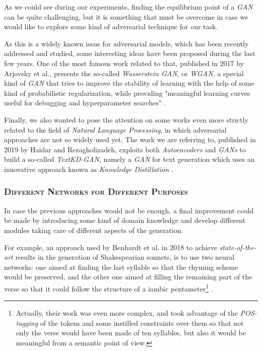 As we could see during our experiments, finding the equilibrium point of a \textit{GAN} can be quite challenging, but it is something that must be overcome in case we would like to explore some kind of adversarial technique for our task.

As this is a widely known issue for adversarial models, which has been recently addressed and studied, some interesting ideas have been proposed during the last few years.
One of the most famous work related to that, published in 2017 by Arjovsky et al., presents the so-called \textit{Wasserstein GAN}, or \textit{WGAN}, a special kind of \textit{GAN} that tries to improve the stability of learning with the help of some kind of probabilistic regularization, while providing "meaningful learning curves useful for debugging and hyperparameter searches" \cite{arjovsky2017wasserstein}.

Finally, we also wanted to pose the attention on some works even more strictly related to the field of \textit{Natural Language Processing}, in which adversarial approaches are not so widely used yet.
The work we are referring to, published in 2019 by Haidar and Rezagholizadeh, exploits both \textit{Autoencoders} and \textit{GANs} to build a so-called \textit{TextKD-GAN}, namely a \textit{GAN} for text generation which uses an innovative approach known as \textit{Knowledge Distillation} \cite{haidar2019textkd}.

\subsubsection{\textsc{Different Networks for Different Purposes}}

In case the previous approaches would not be enough, a final improvement could be made by introducing some kind of domain knowledge and develop different modules taking care of different aspects of the generation.

For example, an approach used by Benhardt et al. in 2018 to achieve \textit{state-of-the-art} results in the generation of Shakespearian sonnets, is to use two neural networks: one aimed at finding the last syllable so that the rhyming scheme would be preserved, and the other one aimed at filling the remaining part of the verse so that it could follow the structure of a iambic pentameter\footnote{
    Actually, their work was even more complex, and took advantage of the \textit{POS-tagging} of the tokens and some instilled constraints over them so that not only the verse would have been made of ten syllables, but also it would be meaningful from a semantic point of view.
} \cite{benhardt2018shall}.

